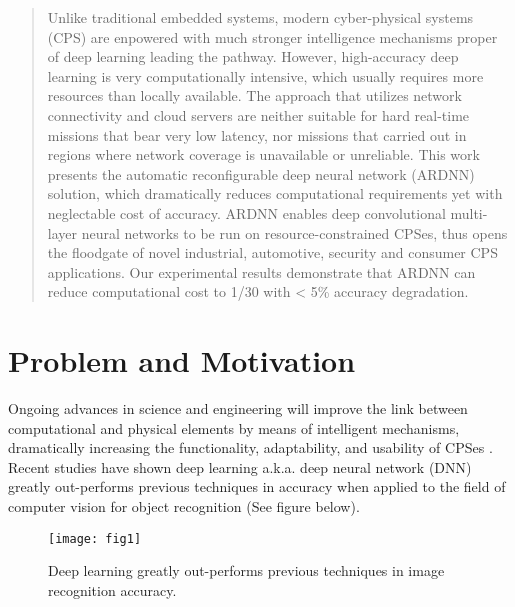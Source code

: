 
\setcounter{section}{0}
\setcounter{figure}{0}
\graphicspath{{./figs/}{./figs/item-kneron/}}


\begin{abstract}
Unlike traditional embedded systems, modern cyber-physical systems (CPS) are enpowered with much stronger intelligence mechanisms proper of deep learning leading the pathway.
However, high-accuracy deep learning is very computationally intensive, which usually requires more resources than locally available.
The approach that utilizes network connectivity and cloud servers are neither suitable for hard real-time missions that bear very low latency,
nor missions that carried out in regions where network coverage is unavailable or unreliable.
This work presents the automatic reconfigurable deep neural network (ARDNN) solution,
which dramatically reduces computational requirements yet with neglectable cost of accuracy.
ARDNN enables deep convolutional multi-layer neural networks to be run on resource-constrained CPSes,
thus opens the floodgate of novel industrial, automotive, security and consumer CPS applications.
Our experimental results demonstrate that ARDNN can reduce computational cost to 1/30 with < 5\% accuracy degradation.
\end{abstract}

\section{Problem and Motivation}

Ongoing advances in science and engineering will improve the link between computational and physical elements by means of intelligent mechanisms,
dramatically increasing the functionality, adaptability, and usability of CPSes \cite{ref1}.
Recent studies have shown deep learning a.k.a. deep neural network (DNN) greatly out-performs previous techniques in accuracy when applied to the field of computer vision for object recognition (See figure below).

\begin{figure}[htbp]
	\centering
    \texttt{[image: fig1]}
	\caption{Deep learning greatly out-performs previous techniques in image recognition accuracy.}
	\label{fig:fig1}
\end{figure}

